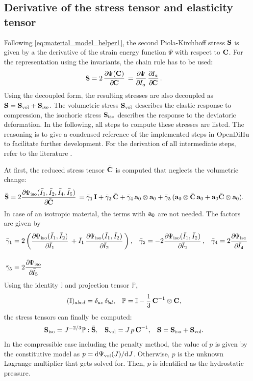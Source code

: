 \subsection{Derivative of the stress tensor and elasticity tensor}
Following \cref{eq:material_model_helper1}, the second Piola-Kirchhoff stress $\textbf{S}$ is given by a the derivative of the strain energy function $\Psi$ with respect to $\textbf{C}$.
For the representation using the invariants, the chain rule has to be used:%
\begin{align*}
   \bfS &= 2\,\p{\Psi(\bfC)}{\bfC} = \p{\Psi}{I_a}\p{I_a}{\bfC}.
\end{align*}
Using the decoupled form, the resulting stresses are also decoupled as $\textbf{S} = \textbf{S}_\text{vol}+\textbf{S}_\text{iso}$. The volumetric stress $\textbf{S}_\text{vol}$ describes the elastic response to compression, the isochoric stress $\textbf{S}_\text{iso}$ describes the response to the deviatoric deformation. In the following, all steps to compute these stresses are listed. The reasoning is to give a condensed reference of the implemented steps in OpenDiHu to facilitate further development.
For the derivation of all intermediate steps, refer to the literature \cite{holzapfel2000nonlinear}.

At first, the reduced stress tensor $\bar{\textbf{C}}$ is computed that neglects the volumetric change:%
%
\begin{align*}
  \bar{\bfS} = 2\p{\Psi_\text{iso}(\bar{I}_1,\bar{I}_2,\bar{I}_4,\bar{I}_5)}{\bar{\bfC}} &= \bar{\gamma}_1\,\bfI + \bar{\gamma}_2\,\bar{\bfC}
  + \bar{\gamma}_4\, \bfa_0 \otimes \bfa_0 + \bar{\gamma}_5\,(\bfa_0 \otimes \bar{\bfC}\,\bfa_0 + \bfa_0\bar{\bfC}\otimes \bfa_0).
\end{align*}
In case of an isotropic material, the terms with $\textbf{a}_0$ are not needed. The factors are given by
%
\begin{align*}
  \bar{\gamma}_1 &= 2\left(\p{\Psi_\text{iso}(\bar{I}_1, \bar{I}_2)}{\bar{I}_1} + \bar{I}_1\,\p{\Psi_\text{iso}(\bar{I}_1, \bar{I}_2)}{\bar{I}_2}\right),
  &\bar{\gamma}_2 &= -2\p{\Psi_\text{iso}(\bar{I}_1, \bar{I}_2)}{\bar{I}_2},
  &\bar{\gamma}_4 &= 2\p{\Psi_\text{iso}}{\bar{I}_4}\\[4mm]
  \bar{\gamma}_5 &= 2\p{\Psi_\text{iso}}{\bar{I}_5}
\end{align*}
%
Using the identity $\mathbb{I}$ and projection tensor $\mathbb{P}$,%
\begin{align*}
  (\mathbb{I})_{abcd} &= \delta_{ac}\,\delta_{bd}, &
  \mathbb{P} &= \mathbb{I} - \displaystyle\frac{\displaystyle{1}}{\displaystyle{3}}\, \textbf{C}^{-1} \otimes \textbf{C},
\end{align*}
the stress tensors can finally be computed:
\begin{align*}
  \textbf{S}_\text{iso} &= J^{-2/3}\mathbb{P}:\bar{\textbf{S}}, &
  \textbf{S}_\text{vol} &= J\,p\,\textbf{C}^{-1}, &
  \textbf{S} &= \textbf{S}_\text{iso} + \textbf{S}_\text{vol}.
\end{align*}
In the compressible case including the penalty method, the value of $p$ is given by the constitutive model as $p = \d \Psi_\text{vol}(J)/\d J$. Otherwise, $p$ is the unknown Lagrange multiplier that gets solved for. Then, $p$ is identified as the hydrostatic pressure.

